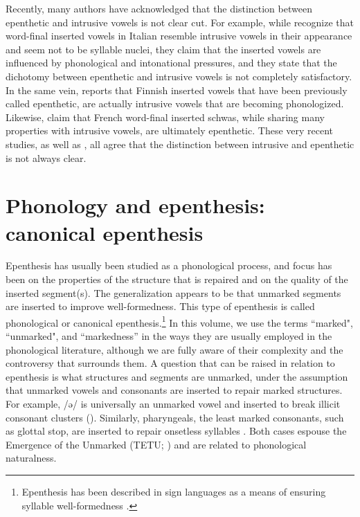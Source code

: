 \documentclass[output=paper,colorlinks,citecolor=brown]{langscibook}
\begin{document}
Recently, many authors have acknowledged that the distinction between epenthetic and intrusive vowels is not clear cut. For example, while \citet{Griceetal2018} recognize that word-final inserted vowels in Italian resemble intrusive vowels in their appearance and seem not to be syllable nuclei, they claim that the inserted vowels are influenced by phonological and intonational pressures, and they state that the dichotomy between epenthetic and intrusive vowels is not completely satisfactory. In the same vein, \citet{Karlin2021} reports that Finnish inserted vowels that have been previously called epenthetic, are actually intrusive vowels that are becoming phonologized. Likewise, \citet{Hutinetal2021} claim that French word-final inserted schwas, while sharing many properties with intrusive vowels, are ultimately epenthetic. These very recent studies, as well as , all agree that the distinction between intrusive and epenthetic is not always clear.

\section{Phonology and epenthesis: canonical epenthesis} \label{can_ep}
Epenthesis has usually been studied as a phonological process, and focus has been on the properties of the structure that is repaired and on the quality of the inserted segment(s). The generalization appears to be that unmarked segments are inserted to improve well-formedness. This type of epenthesis is called phonological or canonical epenthesis.\footnote{Epenthesis has been described in sign languages as a means of ensuring syllable well-formedness \citep{Brentari1990}.} In this volume, we use the terms “marked", ``unmarked", and ``markedness” in the ways they are usually employed in the phonological literature, although we are fully aware of their complexity and the controversy that surrounds them. A question that can be raised in relation to epenthesis is what structures and segments are unmarked, under the assumption that unmarked vowels and consonants are inserted to repair marked structures. For example, /ə/ is universally an unmarked vowel and inserted to break illicit consonant clusters (\citealt{DavidsonStone2003}). Similarly, pharyngeals, the least marked consonants, such as glottal stop, are inserted to repair onsetless syllables \citep{Lombardi2002}. Both cases espouse the Emergence of the Unmarked (TETU; \citealt{McCarthyPrince1994}) and are related to phonological naturalness.
\end{document}
